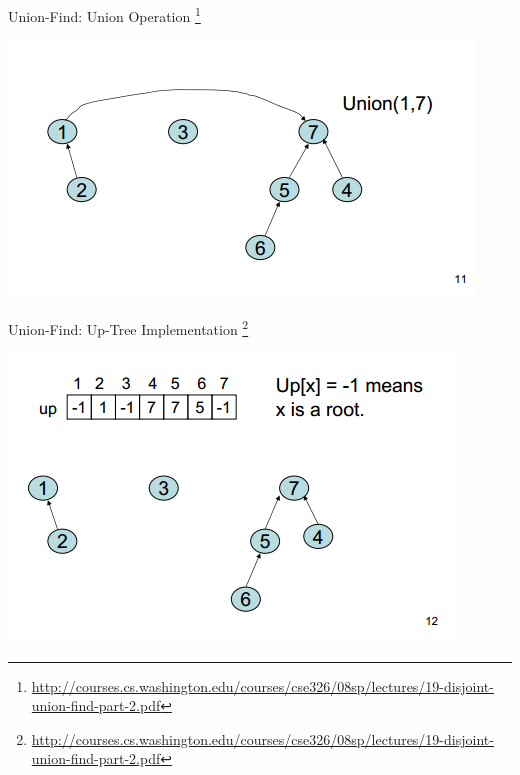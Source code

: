 \documentclass{beamer}
\begin{document}
\begin{frame}{Union-Find: Union Operation \footnote{\url{http://courses.cs.washington.edu/courses/cse326/08sp/lectures/19-disjoint-union-find-part-2.pdf}} }
    \begin{center}
        \includegraphics[scale=0.5]{unionFindTreeRepUnion.png} 
    \end{center}
\end{frame}


\begin{frame}{Union-Find: Up-Tree Implementation \footnote{\url{http://courses.cs.washington.edu/courses/cse326/08sp/lectures/19-disjoint-union-find-part-2.pdf}} }
    \begin{center}
        \includegraphics[scale=0.5]{unionFindTreeRepImplem.png} 
    \end{center}
\end{frame}
\end{document}

